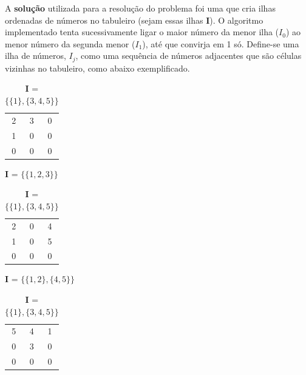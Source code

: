 \documentclass[12pt]{exam}
\begin{document}
        \indent A \textbf{solução} utilizada para a resolução do problema foi uma que cria ilhas ordenadas de números no tabuleiro (sejam essas ilhas \textbf{I}). O algoritmo implementado tenta sucessivamente ligar o maior número da menor ilha ($I_{0}$) ao menor número da segunda menor ($I_{1}$), até que convirja em 1 só. Define-se uma ilha de números, $I_{j}$, como uma sequência de números adjacentes que são células vizinhas no tabuleiro, como abaixo exemplificado.
        \vspace{-2.5mm}
        \begin{table}[ht!]\centering\footnotesize
            \begin{subtable}{0.2\textwidth}
                \centering
                \begin{tabular}{ccc}
                    2 & 3 & 0 \\
                    1 & 0 & 0 \\
                    0 & 0 & 0
                \end{tabular}
                \caption{\textbf{I} = $\{\{1, 2, 3\}\}$}
            \end{subtable}
            \hfill
            \begin{subtable}{0.2\textwidth}
                \centering
                \begin{tabular}{ccc}
                    2 & 0 & 4 \\
                    1 & 0 & 5 \\
                    0 & 0 & 0
                \end{tabular}
                \caption{\textbf{I} = $\{\{1, 2\}, \{4, 5\}\}$}
            \end{subtable}
            \hfill
            \begin{subtable}{0.2\textwidth}
                \centering
                \begin{tabular}{ccc}
                    5 & 4 & 1 \\
                    0 & 3 & 0 \\
                    0 & 0 & 0
                \end{tabular}
                \caption{\textbf{I} = $\{\{1\}, \{3, 4, 5\}\}$}
            \end{subtable}
        \end{table}
\end{document}
